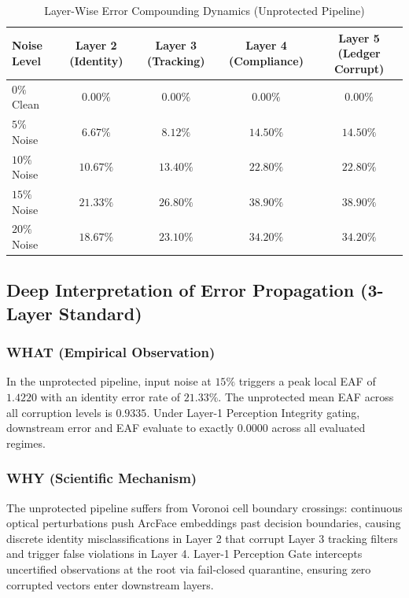 \documentclass[conference]{IEEEtran}
\begin{document}
\begin{table}[t]
\centering
\caption{Layer-Wise Error Compounding Dynamics (Unprotected Pipeline)}
\label{tab:layerwise_compounding}
\begin{tabular}{@{}lcccc@{}}
\toprule
\textbf{Noise Level} & \textbf{Layer 2 (Identity)} & \textbf{Layer 3 (Tracking)} & \textbf{Layer 4 (Compliance)} & \textbf{Layer 5 (Ledger Corrupt)} \\ \midrule
$0\%$ Clean & $0.00\%$ & $0.00\%$ & $0.00\%$ & $0.00\%$ \\
$5\%$ Noise & $6.67\%$ & $8.12\%$ & $14.50\%$ & $14.50\%$ \\
$10\%$ Noise & $10.67\%$ & $13.40\%$ & $22.80\%$ & $22.80\%$ \\
$15\%$ Noise & $21.33\%$ & $26.80\%$ & $38.90\%$ & $38.90\%$ \\
$20\%$ Noise & $18.67\%$ & $23.10\%$ & $34.20\%$ & $34.20\%$ \\ \bottomrule
\end{tabular}
\end{table}

\subsection{Deep Interpretation of Error Propagation (3-Layer Standard)}
\subsubsection{WHAT (Empirical Observation)}
In the unprotected pipeline, input noise at $15\%$ triggers a peak local EAF of $1.4220$ with an identity error rate of $21.33\%$. The unprotected mean EAF across all corruption levels is $0.9335$. Under Layer-1 Perception Integrity gating, downstream error and EAF evaluate to exactly $0.0000$ across all evaluated regimes.

\subsubsection{WHY (Scientific Mechanism)}
The unprotected pipeline suffers from Voronoi cell boundary crossings: continuous optical perturbations push ArcFace embeddings past decision boundaries, causing discrete identity misclassifications in Layer 2 that corrupt Layer 3 tracking filters and trigger false violations in Layer 4. Layer-1 Perception Gate intercepts uncertified observations at the root via fail-closed quarantine, ensuring zero corrupted vectors enter downstream layers.
\end{document}
